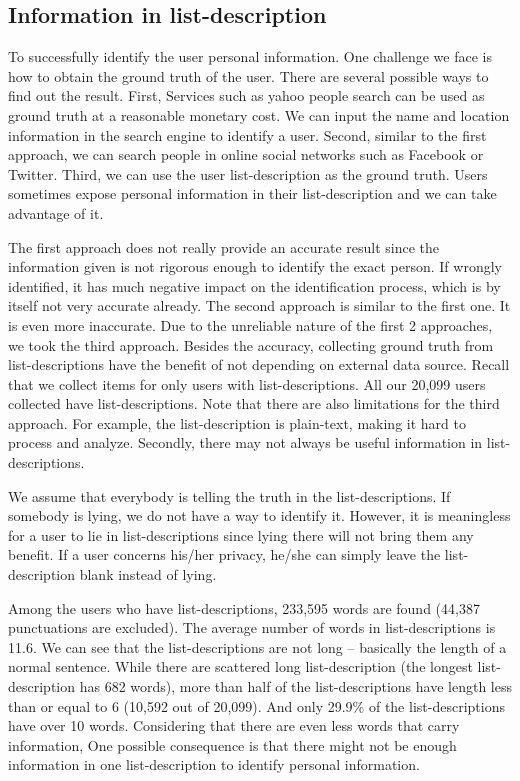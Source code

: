 \documentclass{llncs}
\begin{document}
\subsection{Information in list-description}
To successfully identify the user personal information. One challenge we face is how to obtain the ground truth of the user. There are several possible ways to find out the result. First, Services such as yahoo people search can be used as ground truth at a reasonable monetary cost. We can input the name and location information in the search engine to identify a user. Second, similar to the first approach, we can search people in online social networks such as Facebook or Twitter. Third, we can use the user list-description as the ground truth. Users sometimes expose personal information in their list-description and we can take advantage of it.

The first approach does not really provide an accurate result since the information given is not rigorous enough to identify the exact person. If wrongly identified, it has much negative impact on the identification process, which is by itself not very accurate already. The second approach is similar to the first one. It is even more inaccurate. Due to the unreliable nature of the first 2 approaches, we took the third approach. Besides the accuracy, collecting ground truth from list-descriptions have the benefit of not depending on external data source. Recall that we collect items for only users with list-descriptions. All our 20,099 users collected have list-descriptions. Note that there are also limitations for the third approach. For example, the list-description is plain-text, making it hard to process and analyze. Secondly, there may not always be useful information in list-descriptions.

We assume that everybody is telling the truth in the list-descriptions. If somebody is lying, we do not have a way to identify it. However, it is meaningless for a user to lie in list-descriptions since lying there will not bring them any benefit. If a user concerns his/her privacy, he/she can simply leave the list-description blank instead of lying.

Among the users who have list-descriptions, 233,595 words are found (44,387 punctuations are excluded). The average number of words in list-descriptions is 11.6. We can see that the list-descriptions are not long -- basically the length of a normal sentence. While there are scattered long list-description (the longest list-description has 682 words), more than half of the list-descriptions have length less than or equal to 6 (10,592 out of 20,099). And only 29.9\% of the list-descriptions have over 10 words. Considering that there are even less words that carry information, One possible consequence is that there might not be enough information in one list-description to identify personal information.
\end{document}
